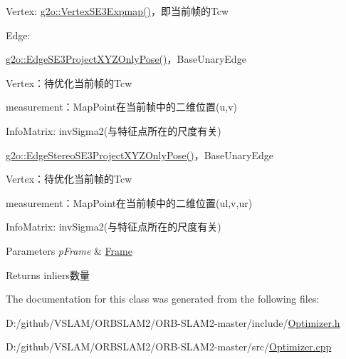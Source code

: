 \begin{DoxyEnumerate}
\item Vertex\+: \mbox{\hyperlink{classg2o_1_1_vertex_s_e3_expmap}{g2o\+::\+Vertex\+S\+E3\+Expmap()}}，即当前帧的\+Tcw
\item Edge\+:
\begin{DoxyItemize}
\item \mbox{\hyperlink{classg2o_1_1_edge_s_e3_project_x_y_z_only_pose}{g2o\+::\+Edge\+S\+E3\+Project\+X\+Y\+Z\+Only\+Pose()}}，\+Base\+Unary\+Edge
\begin{DoxyItemize}
\item Vertex：待优化当前帧的\+Tcw
\item measurement：\+Map\+Point在当前帧中的二维位置(u,v)
\item Info\+Matrix\+: inv\+Sigma2(与特征点所在的尺度有关)
\end{DoxyItemize}
\item \mbox{\hyperlink{classg2o_1_1_edge_stereo_s_e3_project_x_y_z_only_pose}{g2o\+::\+Edge\+Stereo\+S\+E3\+Project\+X\+Y\+Z\+Only\+Pose()}}，\+Base\+Unary\+Edge
\begin{DoxyItemize}
\item Vertex：待优化当前帧的\+Tcw
\item measurement：\+Map\+Point在当前帧中的二维位置(ul,v,ur)
\item Info\+Matrix\+: inv\+Sigma2(与特征点所在的尺度有关)
\end{DoxyItemize}
\end{DoxyItemize}
\end{DoxyEnumerate}


\begin{DoxyParams}{Parameters}
{\em p\+Frame} & \mbox{\hyperlink{class_o_r_b___s_l_a_m2_1_1_frame}{Frame}} \\
\hline
\end{DoxyParams}
\begin{DoxyReturn}{Returns}
inliers数量 
\end{DoxyReturn}


The documentation for this class was generated from the following files\+:\begin{DoxyCompactItemize}
\item 
D\+:/github/\+V\+S\+L\+A\+M/\+O\+R\+B\+S\+L\+A\+M2/\+O\+R\+B-\/\+S\+L\+A\+M2-\/master/include/\mbox{\hyperlink{_optimizer_8h}{Optimizer.\+h}}\item 
D\+:/github/\+V\+S\+L\+A\+M/\+O\+R\+B\+S\+L\+A\+M2/\+O\+R\+B-\/\+S\+L\+A\+M2-\/master/src/\mbox{\hyperlink{_optimizer_8cpp}{Optimizer.\+cpp}}\end{DoxyCompactItemize}
